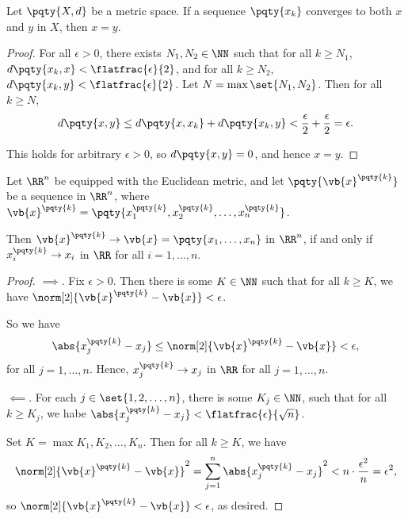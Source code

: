 \begin{proposition}
    \label{prop:limits-are-unique-in-metric-spaces}%
    Let \(\pqty{X, d}\) be a metric space. If a sequence \(\pqty{x_k}\) converges to both \(x\) and \(y\) in \(X\), then \(x = y\).
\end{proposition}

\begin{proof}
    For all \(\epsilon > 0\), there exists \(N_1, N_2 \in \NN\) such that for all \(k \geq N_1\), \(d\pqty{x_k, x} < \flatfrac{\epsilon}{2}\), and for all \(k \geq N_2\), \(d\pqty{x_k, y} < \flatfrac{\epsilon}{2}\). Let \(N = \max\set{N_1, N_2}\). Then for all \(k \geq N\),
    \[
        d\pqty{x, y} \leq d\pqty{x, x_k} + d\pqty{x_k, y} < \frac{\epsilon}{2} + \frac{\epsilon}{2} = \epsilon.
    \]

    This holds for arbitrary \(\epsilon > 0\), so \(d\pqty{x, y} = 0\), and hence \(x = y\).
\end{proof}

\begin{proposition}
    \label{prop:convergence-in-rn-is-componentwise}%
    Let \(\RR^n\) be equipped with the Euclidean metric, and
    let \(\pqty{\vb{x}^{\pqty{k}}}\) be a sequence in \(\RR^n\), where \(\vb{x}^{\pqty{k}} = \pqty{x_1^{\pqty{k}}, x_2^{\pqty{k}}, \ldots, x_n^{\pqty{k}}}\).
    
    Then \(\vb{x}^{\pqty{k}} \to \vb{x} = \pqty{x_1, \dots, x_n}\) in \(\RR^n\), if and only if \(x_{i}^{\pqty{k}} \to x_i\) in \(\RR\) for all \(i = 1, \dots, n\).
\end{proposition}

\begin{proof}
    \(\implies\). Fix \(\epsilon > 0\). Then there is some \(K \in \NN\) such that for all \(k \geq K\), we have \(\norm[2]{\vb{x}^{\pqty{k}} - \vb{x}} < \epsilon\).

    So we have
    \[
        \abs{x_j^{\pqty{k}} - x_j} \leq \norm[2]{\vb{x}^{\pqty{k}} - \vb{x}} < \epsilon,
    \]
    for all \(j = 1, \dots, n\). Hence, \(x_j^{\pqty{k}} \to x_j\) in \(\RR\) for all \(j = 1, \dots, n\).

    \(\impliedby\). For each \(j \in \set{1, 2, \ldots, n}\), there is some \(K_j \in \NN\), such that for all \(k \geq K_j\), we habe \(\abs{x_j^{\pqty{k}} - x_j} < \flatfrac{\epsilon}{\sqrt{n}}\).

    Set \(K = \max{K_1, K_2, \ldots, K_n}\). Then for all \(k \geq K\), we have
    \[
        \norm[2]{\vb{x}^{\pqty{k}} - \vb{x}}^2 = \sum_{j = 1}^{n} \abs{x_j^{\pqty{k}} - x_j}^2 < n \cdot \frac{\epsilon^2}{n} = \epsilon^2,
    \]
    so \(\norm[2]{\vb{x}^{\pqty{k}} - \vb{x}} < \epsilon\), as desired.
\end{proof}


